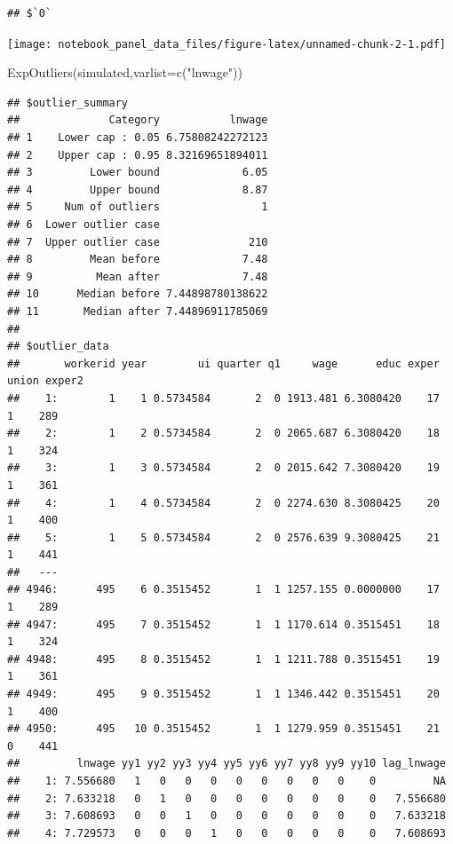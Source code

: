 \documentclass[
]{article}
\newenvironment{Shaded}{\begin{snugshade}}{\end{snugshade}}
\newcommand{\AttributeTok}[1]{\textcolor[rgb]{0.77,0.63,0.00}{#1}}
\newcommand{\FunctionTok}[1]{\textcolor[rgb]{0.00,0.00,0.00}{#1}}
\newcommand{\NormalTok}[1]{#1}
\newcommand{\StringTok}[1]{\textcolor[rgb]{0.31,0.60,0.02}{#1}}
\begin{document}
\begin{verbatim}
## $`0`
\end{verbatim}

\texttt{[image: notebook\_panel\_data\_files/figure-latex/unnamed-chunk-2-1.pdf]}

\begin{Shaded}
\begin{Highlighting}[]
  \FunctionTok{ExpOutliers}\NormalTok{(simulated,}\AttributeTok{varlist=}\FunctionTok{c}\NormalTok{(}\StringTok{"lnwage"}\NormalTok{))}
\end{Highlighting}
\end{Shaded}

\begin{verbatim}
## $outlier_summary
##              Category           lnwage
## 1    Lower cap : 0.05 6.75808242272123
## 2    Upper cap : 0.95 8.32169651894011
## 3         Lower bound             6.05
## 4         Upper bound             8.87
## 5     Num of outliers                1
## 6  Lower outlier case                 
## 7  Upper outlier case              210
## 8         Mean before             7.48
## 9          Mean after             7.48
## 10      Median before 7.44898780138622
## 11       Median after 7.44896911785069
## 
## $outlier_data
##       workerid year        ui quarter q1     wage      educ exper union exper2
##    1:        1    1 0.5734584       2  0 1913.481 6.3080420    17     1    289
##    2:        1    2 0.5734584       2  0 2065.687 6.3080420    18     1    324
##    3:        1    3 0.5734584       2  0 2015.642 7.3080420    19     1    361
##    4:        1    4 0.5734584       2  0 2274.630 8.3080425    20     1    400
##    5:        1    5 0.5734584       2  0 2576.639 9.3080425    21     1    441
##   ---                                                                         
## 4946:      495    6 0.3515452       1  1 1257.155 0.0000000    17     1    289
## 4947:      495    7 0.3515452       1  1 1170.614 0.3515451    18     1    324
## 4948:      495    8 0.3515452       1  1 1211.788 0.3515451    19     1    361
## 4949:      495    9 0.3515452       1  1 1346.442 0.3515451    20     1    400
## 4950:      495   10 0.3515452       1  1 1279.959 0.3515451    21     0    441
##         lnwage yy1 yy2 yy3 yy4 yy5 yy6 yy7 yy8 yy9 yy10 lag_lnwage
##    1: 7.556680   1   0   0   0   0   0   0   0   0    0         NA
##    2: 7.633218   0   1   0   0   0   0   0   0   0    0   7.556680
##    3: 7.608693   0   0   1   0   0   0   0   0   0    0   7.633218
##    4: 7.729573   0   0   0   1   0   0   0   0   0    0   7.608693

\end{verbatim}
\end{document}
